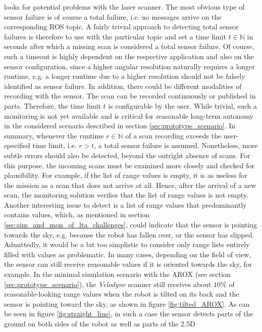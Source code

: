 \documentclass[english, master, utf8]{base/thesis_KBS}
\newcommand{\code}{\collectverb{\codebox}}
\begin{document}
looks for potential problems with the laser scanner. The most obvious type of sensor failure is of course a total failure, i.e. no messages arrive on the corresponding ROS topic.
A fairly trivial approach to detecting total sensor failures is therefore to use \code{rospy.wait_for_message()} with the particular topic and set a time limit $t \in \mathbb{N}$
in seconds after which a missing scan is considered a total sensor failure. Of course, such a timeout is highly dependent on the respective application and also on the sensor 
configuration, since a higher angular resolution naturally requires a longer runtime, e.g. a longer runtime due to a higher resolution should not be falsely identified 
as sensor failure. In addition, there could be different modalities of recording with the sensor. The scan can be recorded continuously or published in parts.
Therefore, the time limit $t$ is configurable by the user. While trivial, such a monitoring is not yet available and is critical for reasonable long-term autonomy in the 
considered scenario described in section \ref{sec:prototype_scenario}. In summary, whenever the runtime $r \in \mathbb{N}$ of a scan recording exceeds the user-specified time
limit, i.e. $r > t$, a total sensor failure is assumed. Nonetheless, more subtle errors should also be detected, beyond the outright absence of scans.
For this purpose, the incoming scans must be examined more closely and checked for plausibility. For example, if the list of range values is empty, it is as useless for
the mission as a scan that does not arrive at all. Hence, after the arrival of a new scan, the monitoring solution verifies that the list of range values is not empty.
Another interesting issue to detect is a list of range values that predominantly contains \code{inf} values, which, as mentioned in section
\ref{sec:sim_and_mon_of_lta_challenges}, could indicate that the sensor is pointing towards the sky, e.g. because the robot has fallen over,
or the sensor has slipped. Admittedly, it would be a bit too simplistic to consider only range lists entirely filled with \code{inf} values as problematic.
In many cases, depending on the field of view, the sensor can still receive reasonable values if it is oriented towards the sky, for example.
In the minimal simulation scenario with the AROX (see section \ref{sec:prototype_scenario}), the \textit{Velodyne} scanner still receives about $10$\% of 
reasonable-looking range values when the robot is tilted on its back and the sensor is pointing toward the sky, as shown in figure \ref{fig:tilted_AROX}.
As can be seen in figure \ref{fig:straight_line}, in such a case the sensor detects parts of the ground on both sides of the robot as well as parts of the 2.5D 
\end{document}
